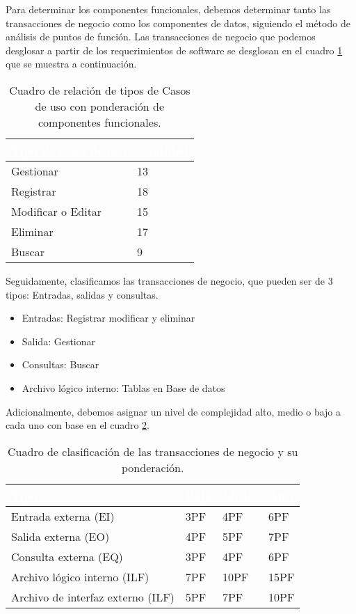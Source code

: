 Para determinar los componentes funcionales, debemos determinar tanto las transacciones de negocio como los componentes de datos, siguiendo el método de análisis de puntos de función.  Las transacciones de negocio que podemos desglosar a partir de los requerimientos de software se desglosan en el cuadro \ref{tbl:componentesf} que se muestra a continuación.

\begin{table}[H]
	\centering
	\begin{tabular}{|p{4cm}|p{4cm}|}
		\hline
		\rowcolor{black} \textcolor{white} {\textbf{Tipo de Caso de uso}} & \textcolor{white}{\textbf{Cantidad}} \\ \hline
		Gestionar & 13  \\
		\hline
		Registrar & 18  \\
		\hline
		Modificar o Editar & 15  \\
		\hline
		Eliminar & 17  \\
		\hline
		Buscar & 9  \\
		\hline
	\end{tabular}
	 \caption{Cuadro de relación de tipos de Casos de uso con ponderación de componentes funcionales.}
	 \label{tbl:componentesf}
\end{table}

Seguidamente, clasificamos las transacciones de negocio, que pueden ser de 3 tipos: Entradas, salidas y consultas. 

\begin{itemize}
\item Entradas: Registrar modificar y eliminar
\item Salida: Gestionar
\item Consultas: Buscar
\item Archivo lógico interno: Tablas en Base de datos

\end{itemize}

Adicionalmente, debemos asignar un nivel de complejidad alto, medio o bajo a cada uno con base en el cuadro \ref{tbl:clasif}.

	\begin{table}[H]
	\centering
	\begin{tabular}{|p{3cm}|p{1cm}|p{1cm}|p{1cm}|}
		\hline
		\rowcolor{black} \textcolor{white} {\textbf{Tipo}} & \textcolor{white}{\textbf{Baja}} & \textcolor{white}{\textbf{Media}} & \textcolor{white}{\textbf{Alta}} \\ \hline
		Entrada  externa (EI) & 3PF & 4PF & 6PF  \\
		\hline
		Salida  externa (EO) & 4PF & 5PF & 7PF  \\
		\hline
		Consulta  externa (EQ) & 3PF & 4PF & 6PF  \\
		\hline
		Archivo lógico interno (ILF) & 7PF & 10PF & 15PF  \\
		\hline
		Archivo de interfaz externo (ILF) & 5PF & 7PF & 10PF  \\
		\hline
	\end{tabular}
	\caption{Cuadro de clasificación de las transacciones de negocio y su ponderación.}
	\label{tbl:clasif}
\end{table}

